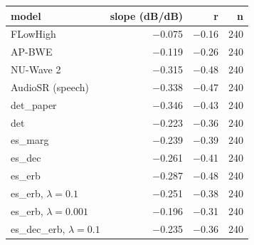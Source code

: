 \begin{tabular}{lrrr}
\toprule
model & slope (dB/dB) & r & n \\
\midrule
FLowHigh & $-$0.075 & $-$0.16 & 240 \\
AP-BWE & $-$0.119 & $-$0.26 & 240 \\
NU-Wave 2 & $-$0.315 & $-$0.48 & 240 \\
AudioSR (speech) & $-$0.338 & $-$0.47 & 240 \\
det\_paper & $-$0.346 & $-$0.43 & 240 \\
det & $-$0.223 & $-$0.36 & 240 \\
es\_marg & $-$0.239 & $-$0.39 & 240 \\
es\_dec & $-$0.261 & $-$0.41 & 240 \\
es\_erb & $-$0.287 & $-$0.48 & 240 \\
es\_erb, $\lambda{=}0.1$ & $-$0.251 & $-$0.38 & 240 \\
es\_erb, $\lambda{=}0.001$ & $-$0.196 & $-$0.31 & 240 \\
es\_dec\_erb, $\lambda{=}0.1$ & $-$0.235 & $-$0.36 & 240 \\
\bottomrule
\end{tabular}
